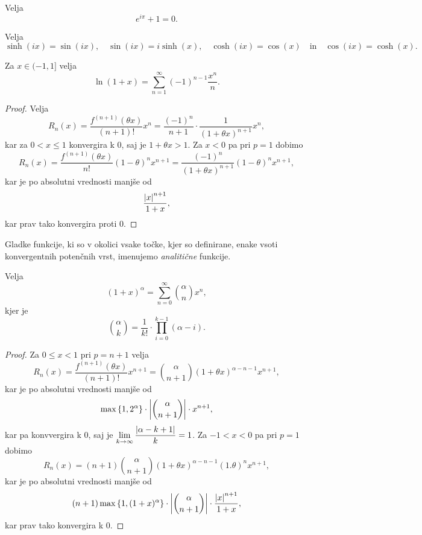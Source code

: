 \documentclass[12pt, a4paper]{article}
\begin{document}
\begin{posledica}
Velja
\[
e^{i\pi}+1=0.
\]
\end{posledica}

\begin{opomba}
Velja
\[
\sinh(ix)=\sin(ix),\quad \sin(ix)=i\sinh(x),\quad \cosh(ix)=\cos(x)\quad\text{in}\quad \cos(ix)=\cosh(x).
\]
\end{opomba}

\begin{trditev}
Za $x\in(-1,1]$ velja
\[
\ln(1+x)=\sum_{n=1}^\infty (-1)^{n-1}\frac{x^n}{n}.
\]
\end{trditev}

\begin{proof}
Velja
\[
R_n(x)=\frac{f^{(n+1)}(\theta x)}{(n+1)!}x^n=\frac{(-1)^n}{n+1}\cdot\frac{1}{(1+\theta x)^{n+1}}x^n,
\]
kar za $0<x\leq 1$ konvergira k $0$, saj je $1+\theta x>1$. Za $x<0$ pa pri $p=1$ dobimo
\[
R_n(x)=\frac{f^{(n+1)}(\theta x)}{n!}(1-\theta)^n x^{n+1}=\frac{(-1)^n}{(1+\theta x)^{n+1}}(1-\theta)^n x^{n+1},
\]
kar je po absolutni vrednosti manjše od
\[
\frac{\left\lvert x\right\rvert^{n+1}}{1+x},
\]
kar prav tako konvergira proti $0$.
\end{proof}

\begin{opomba}
Gladke funkcije, ki so v okolici vsake točke, kjer so definirane, enake vsoti konvergentnih potenčnih vrst, imenujemo \emph{analitične} funkcije.
\end{opomba}

\begin{trditev}
Velja
\[
(1+x)^\alpha=\sum_{n=0}^\infty\binom{\alpha}{n}x^n,
\]
kjer je 
\[
\binom{\alpha}{k}=\frac{1}{k!}\cdot\prod_{i=0}^{k-1}(\alpha-i).
\]
\end{trditev}

\begin{proof}
Za $0\leq x<1$ pri $p=n+1$ velja
\[
R_n(x)=\frac{f^{(n+1)}(\theta x)}{(n+1)!}x^{n+1}=\binom{\alpha}{n+1}(1+\theta x)^{\alpha-n-1}x^{n+1},
\]
kar je po absolutni vrednosti manjše od
\[
\max\left\{1,2^\alpha\right\}\cdot\left\lvert \binom{\alpha}{n+1}\right\rvert\cdot x^{n+1},
\]
kar pa konvvergira k $0$, saj je $\displaystyle\lim_{k\to\infty}\frac{\left\lvert \alpha-k+1\right\rvert}{k}=1$. Za $-1<x<0$ pa pri $p=1$ dobimo
\[
R_n(x)=(n+1)\binom{\alpha}{n+1}(1+\theta x)^{\alpha-n-1}(1.\theta)^nx^{n+1},
\]
kar je po absolutni vrednosti manjše od
\[
(n+1)\max\left\{1,(1+x)^\alpha\right\}\cdot\left\lvert \binom{\alpha}{n+1}\right\rvert\cdot\frac{\left\lvert x\right\rvert^{n+1}}{1+x},
\]
kar prav tako konvergira k $0$.
\end{proof}
\end{document}
